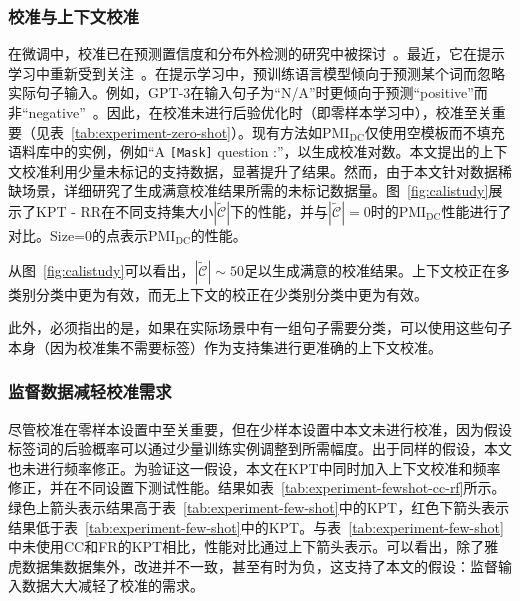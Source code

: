 \subsubsection{校准与上下文校准}
\label{app:supportsize}
在微调中，校准已在预测置信度和分布外检测的研究中被探讨~\cite{kong-etal-2020-calibrated}。最近，它在提示学习中重新受到关注~\cite{pmlr-v139-zhao21c, holtzman2021surface}。在提示学习中，预训练语言模型倾向于预测某个词而忽略实际句子输入。例如，GPT-3在输入句子为“N/A”时更倾向于预测“positive”而非“negative”~\cite{pmlr-v139-zhao21c}。因此，在校准未进行后验优化时（即零样本学习中），校准至关重要（见表~\ref{tab:experiment-zero-shot}）。现有方法如$\text{PMI}_\text{DC}$仅使用空模板而不填充语料库中的实例，例如“A \texttt{[Mask]} question :”，以生成校准对数。本文提出的上下文校准利用少量未标记的支持数据，显著提升了结果。然而，由于本文针对数据稀缺场景，详细研究了生成满意校准结果所需的未标记数据量。图~\ref{fig:calistudy}展示了KPT - RR在不同支持集大小$|\tilde{\mathcal{C}}|$下的性能，并与$|\tilde{\mathcal{C}}|=0$时的$\text{PMI}_\text{DC}$性能进行了对比。Size=0的点表示$\text{PMI}_\text{DC}$的性能。

从图~\ref{fig:calistudy}可以看出，$|\tilde{\mathcal{C}}|\sim 50$足以生成满意的校准结果。上下文校正在多类别分类中更为有效，而无上下文的校正在少类别分类中更为有效。

此外，必须指出的是，如果在实际场景中有一组句子需要分类，可以使用这些句子本身（因为校准集不需要标签）作为支持集进行更准确的上下文校准。

\subsubsection{监督数据减轻校准需求}
\label{app:fewshot-cali}
尽管校准在零样本设置中至关重要，但在少样本设置中本文未进行校准，因为假设标签词的后验概率可以通过少量训练实例调整到所需幅度。出于同样的假设，本文也未进行频率修正。为验证这一假设，本文在KPT中同时加入上下文校准和频率修正，并在不同设置下测试性能。结果如表~\ref{tab:experiment-fewshot-cc-rf}所示。绿色上箭头\gd 表示结果高于表~\ref{tab:experiment-few-shot}中的KPT，红色下箭头\bd 表示结果低于表~\ref{tab:experiment-few-shot}中的KPT。与表~\ref{tab:experiment-few-shot}中未使用CC和FR的KPT相比，性能对比通过上下箭头表示。可以看出，除了雅虎数据集数据集外，改进并不一致，甚至有时为负，这支持了本文的假设：监督输入数据大大减轻了校准的需求。


